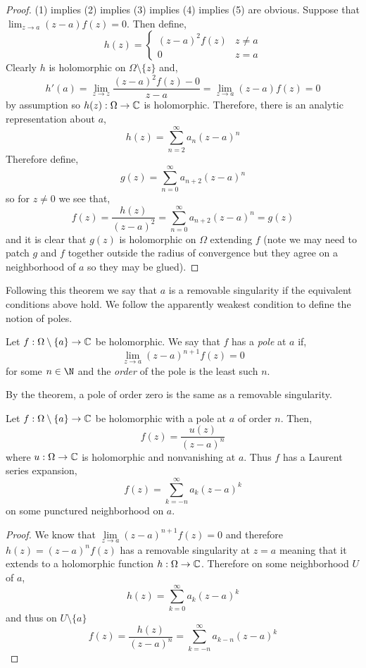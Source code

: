 \documentclass[12pt]{article}
\begin{document}
\begin{proof}
(1) implies (2) implies (3) implies (4) implies (5) are obvious. Suppose that $\lim_{z \to a} (z - a) f(z) = 0$. Then define,
\[ h(z) = 
\begin{cases}
(z - a)^2 f(z) & z \neq a
\\
0 & z = a
\end{cases} \]
Clearly $h$ is holomorphic on $\Omega \setminus \{ z \}$ and,
\[ h'(a) = \lim\limits_{z \to z} \frac{(z - a)^2 f(z) - 0}{z - a} = \lim_{z \to a} (z - a) f(z) = 0 \]
by assumption so $h(z) : \Omega \to \mathbb{C}$ is holomorphic. Therefore, there is an analytic representation about $a$,
\[ h(z) = \sum_{n = 2}^{\infty} a_n (z - a)^n \]
Therefore define,
\[ g(z) = \sum_{n = 0}^{\infty} a_{n+2} (z - a)^n \]
so for $z \neq 0$ we see that,
\[ f(z) = \frac{h(z)}{(z - a)^2} = \sum_{n = 0}^\infty a_{n+2} (z - a)^n = g(z) \]
and it is clear that $g(z)$ is holomorphic on $\Omega$ extending $f$ (note we may need to patch $g$ and $f$ together outside the radius of convergence but they agree on a neighborhood of $a$ so they may be glued).
\end{proof}

\begin{rmk}
Following this theorem we say that $a$ is a removable singularity if the equivalent conditions above hold. We follow the apparently weakest condition to define the notion of poles.
\end{rmk}

\begin{defn}
Let $f : \Omega \setminus \{ a \} \to \mathbb{C}$ be holomorphic. We say that $f$ has a \textit{pole} at $a$ if,
\[ \lim_{z \to a} (z - a)^{n + 1} f(z) = 0 \]
for some $n \in \N$ and the \textit{order} of the pole is the least such $n$.
\end{defn}

\begin{rmk}
By the theorem, a pole of order zero is the same as a removable singularity.
\end{rmk}

\begin{prop}
Let $f : \Omega \setminus \{ a \} \to \mathbb{C}$ be holomorphic with a pole at $a$ of order $n$. Then,
\[ f(z) = \frac{u(z)}{(z - a)^n} \]
where $u : \Omega \to \mathbb{C}$ is holomorphic and nonvanishing at $a$. Thus $f$ has a Laurent series expansion,
\[ f(z) = \sum_{k = - n}^{\infty} a_k (z - a)^k \]
on some punctured neighborhood on $a$.
\end{prop}

\begin{proof}
We know that $\lim\limits_{z \to a} (z - a)^{n+1} f(z) = 0$ and therefore $h(z) = (z - a)^n f(z)$ has a removable singularity at $z = a$ meaning that it extends to a holomorphic function $h : \Omega \to \mathbb{C}$. Therefore on some neighborhood $U$ of $a$,
\[ h(z) = \sum_{k = 0}^{\infty} a_k (z - a)^k \]
and thus on $U \setminus \{ a \}$
\[ f(z) = \frac{h(z)}{(z - a)^n} = \sum_{k = - n}^{\infty} a_{k - n} (z - a)^k \]
\end{proof}
\end{document}
